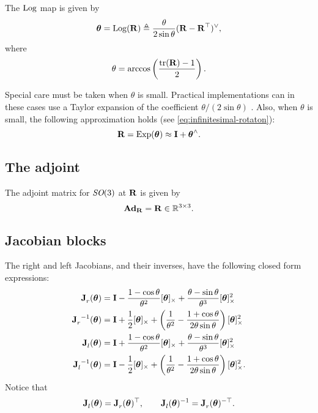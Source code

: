 The $\Log$ map is given by
\begin{equation} \label{eq:Log-SO3}
  \vectheta = \Log(\matR) \triangleq \frac{\theta}{2 \sin \theta} (\matR - \matR\trans)^\vee,
\end{equation}
where
\begin{equation}
  \theta = \arccos \left( \frac{\tr(\matR) - 1}{2} \right).
\end{equation}

Special care must be taken when $\theta$ is small.
Practical implementations can in these cases use a Taylor expansion of the coefficient $\theta / (2 \sin \theta)$ \cite{Eade2013LieTransformations}.
Also, when $\theta$ is small, the following approximation holds (see \eqref{eq:infinitesimal-rotaton}):
\begin{equation} \label{eq:SO3-Exp-approx}
  \matR = \Exp(\vectheta) \approx \matI + \vectheta^\wedge.
\end{equation}

\subsection{The adjoint}
The adjoint matrix for $\SO(3)$ at $\matR$ is given by
\begin{equation}
  \mAd_\matR = \matR  \in \bbR^{3 \times 3}.
\end{equation}

\subsection{Jacobian blocks} \label{sec:Jacobians-SO3}
The right and left Jacobians, and their inverses, have the following closed form expressions: 
\begin{align}
\jac{}{r}(\vectheta) &= \matI - \frac{1-\cos\theta}{\theta^2}\skewsymm{\vectheta} + \frac{\theta-\sin\theta}{\theta^3}\skewsymm{\vectheta}^2\\
\jac{}{r}^{-1}(\vectheta) &= \matI + \frac{1}{2}\skewsymm{\vectheta} + \left(\frac{1}{\theta^2} - \frac{1+\cos\theta}{2\theta\sin\theta}\right)\skewsymm{\vectheta}^2 \\
\jac{}{l}(\vectheta) &= \matI + \frac{1-\cos\theta}{\theta^2}\skewsymm{\vectheta} + \frac{\theta-\sin\theta}{\theta^3}\skewsymm{\vectheta}^2 \label{eq:SO3-left-jac}\\
\jac{}{l}^{-1}(\vectheta) &= \matI - \frac{1}{2}\skewsymm{\vectheta} + \left(\frac{1}{\theta^2} - \frac{1+\cos\theta}{2\theta\sin\theta}\right)\skewsymm{\vectheta}^2.
\end{align}
Notice that
\begin{equation}
  \jac{}{l}(\vectheta) = \jac{}{r}(\vectheta)\trans, \quad\quad \jac{}{l}(\vectheta)^{-1} = \jac{}{r}(\vectheta)\invtrans.
\end{equation}

